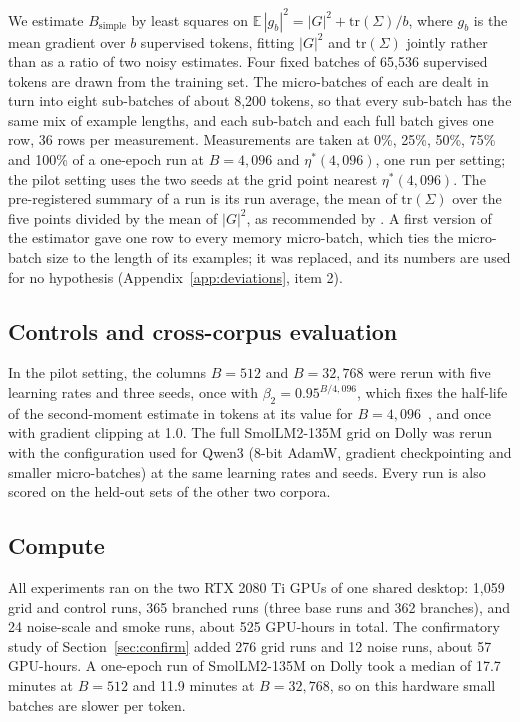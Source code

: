 \documentclass[10pt]{article}
\newcommand{\bsimple}{B_{\mathrm{simple}}}
\begin{document}
We estimate $\bsimple$ by least squares on $\mathbb{E}\,|g_b|^2 = |G|^2 + \mathrm{tr}(\Sigma)/b$, where $g_b$ is the mean gradient over $b$ supervised tokens, fitting $|G|^2$ and $\mathrm{tr}(\Sigma)$ jointly rather than as a ratio of two noisy estimates. Four fixed batches of 65,536 supervised tokens are drawn from the training set. The micro-batches of each are dealt in turn into eight sub-batches of about 8,200 tokens, so that every sub-batch has the same mix of example lengths, and each sub-batch and each full batch gives one row, 36 rows per measurement. Measurements are taken at 0\%, 25\%, 50\%, 75\% and 100\% of a one-epoch run at $B = 4{,}096$ and $\eta^*(4{,}096)$, one run per setting; the pilot setting uses the two seeds at the grid point nearest $\eta^*(4{,}096)$. The pre-registered summary of a run is its run average, the mean of $\mathrm{tr}(\Sigma)$ over the five points divided by the mean of $|G|^2$, as recommended by \citet{mccandlish2018}. A first version of the estimator gave one row to every memory micro-batch, which ties the micro-batch size to the length of its examples; it was replaced, and its numbers are used for no hypothesis (Appendix~\ref{app:deviations}, item 2).

\subsection{Controls and cross-corpus evaluation}\label{sec:controls-setup}

In the pilot setting, the columns $B = 512$ and $B = 32{,}768$ were rerun with five learning rates and three seeds, once with $\beta_2 = 0.95^{B/4{,}096}$, which fixes the half-life of the second-moment estimate in tokens at its value for $B = 4{,}096$~\citep{marek2025}, and once with gradient clipping at 1.0. The full SmolLM2-135M grid on Dolly was rerun with the configuration used for Qwen3 (8-bit AdamW, gradient checkpointing and smaller micro-batches) at the same learning rates and seeds. Every run is also scored on the held-out sets of the other two corpora.

\subsection{Compute}

All experiments ran on the two RTX 2080 Ti GPUs of one shared desktop: 1,059 grid and control runs, 365 branched runs (three base runs and 362 branches), and 24 noise-scale and smoke runs, about 525 GPU-hours in total. The confirmatory study of Section~\ref{sec:confirm} added 276 grid runs and 12 noise runs, about 57 GPU-hours. A one-epoch run of SmolLM2-135M on Dolly took a median of 17.7 minutes at $B = 512$ and 11.9 minutes at $B = 32{,}768$, so on this hardware small batches are slower per token.
\end{document}
